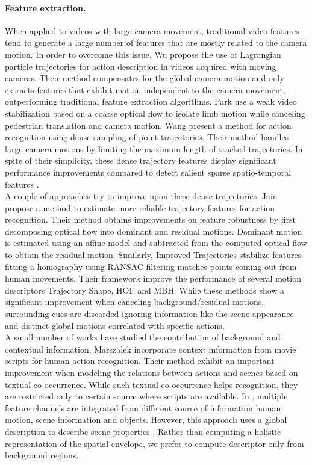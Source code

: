 \paragraph{\textbf{Feature extraction.}} When applied to videos with large camera movement, traditional video features tend to generate a large number of features that are mostly related to the camera motion. In order to overcome this issue, Wu \etal \cite{wu2011} propose the use of Lagrangian particle trajectories for action description in videos acquired with moving cameras. Their method compensates for the global camera motion and only extracts features that exhibit motion independent to the camera movement, outperforming traditional feature extraction algorithms. Park \etal \cite{park2013} use a weak video stabilization based on a coarse optical flow to isolate limb motion while canceling pedestrian translation and camera motion. Wang \etal \cite{wang2011} present a method for action recognition using dense sampling of point trajectories. Their method handles large camera motions by limiting the maximum length of tracked trajectories. In spite of their simplicity, these dense trajectory features display significant performance improvements compared to detect salient sparse spatio-temporal features \cite{laptev2005}.\\
A couple of approaches try to improve upon these dense trajectories. Jain \etal \cite{jain2013} propose a method to estimate more reliable trajectory features for action recognition. Their method obtains improvements on feature robustness by first decomposing optical flow into dominant and residual motions. Dominant motion is estimated using an affine model and subtracted from the computed optical flow to obtain the residual motion. Similarly, Improved Trajectories \cite{wang2013} stabilize features fitting a homography using RANSAC filtering matches points coming out from human movements. Their framework improve the performance of several motion descriptors \ie Trajectory Shape, HOF and MBH. While these methods show a significant improvement when canceling background/residual motions, surrounding cues are discarded ignoring information like the scene appearance and distinct global motions correlated with specific actions.\\
A small number of works have studied the contribution of background and contextual information. Marszalek \etal \cite{marszalek2009} incorporate context information from movie scripts for human action recognition. Their method exhibit an important improvement when modeling the relations between actions and scenes based on textual co-occurrence. While such textual co-occurrence helps recognition, they are restricted only to certain source where scripts are available. In \cite{ikizler2010}, multiple feature channels are integrated from different source of information \ie human motion, scene information and objects. However, this approach uses a global description to describe scene properties \cite{oliva2001}. Rather than computing a holistic representation of the spatial envelope, we prefer to compute descriptor only from background regions. \\
